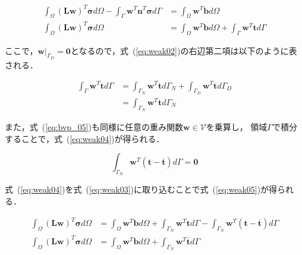 \begin{align}
  \int_\Omega (\boldsymbol{L}\boldsymbol{w})^T \boldsymbol{\sigma} d\Omega - \int_\Gamma \boldsymbol{w}^T\boldsymbol{n}^T\boldsymbol{\sigma} d\Gamma &= \int_\Omega \boldsymbol{w}^T \boldsymbol{b} d\Omega \nonumber \\
  \label{eq:weak02}
  \int_\Omega (\boldsymbol{L}\boldsymbol{w})^T \boldsymbol{\sigma} d\Omega &= \int_\Omega \boldsymbol{w}^T \boldsymbol{b} d\Omega + \int_\Gamma \boldsymbol{w}^T \boldsymbol{t} d\Gamma
\end{align}

\noindent
ここで，$\boldsymbol{w}|_{\Gamma_D}=\boldsymbol{0}$となるので，式~(\ref{eq:weak02})の右辺第二項は以下のように表される．

\begin{align}
  \int_\Gamma \boldsymbol{w}^T \boldsymbol{t} d\Gamma &= \int_{\Gamma_N} \boldsymbol{w}^T \boldsymbol{t} d\Gamma_N + \int_{\Gamma_D} \boldsymbol{w}^T \boldsymbol{t} d\Gamma_D \nonumber \\
  \label{eq:weak03}
  &= \int_{\Gamma_N} \boldsymbol{w}^T \boldsymbol{t} d\Gamma_N
\end{align}

\noindent
また，式~(\ref{eq:bvp_05})も同様に任意の重み関数$\boldsymbol{w}\in\mathcal{V}$を乗算し，
領域$\Gamma$で積分することで，式~(\ref{eq:weak04})が得られる．

\begin{equation}
  \label{eq:weak04}
  \int _{\Gamma_N} \boldsymbol{w}^T (\boldsymbol{t} - \overline{\boldsymbol{t}}) d\Gamma = \boldsymbol{0}
\end{equation}

\newpage

\noindent
式~(\ref{eq:weak04})を式~(\ref{eq:weak03})に取り込むことで式~(\ref{eq:weak05})が得られる．

\begin{align}
  \int_\Omega (\boldsymbol{L}\boldsymbol{w})^T \boldsymbol{\sigma} d\Omega &= \int_\Omega \boldsymbol{w}^T \boldsymbol{b} d\Omega + \int_{\Gamma_N} \boldsymbol{w}^T \boldsymbol{t} d\Gamma - \int_{\Gamma_N} \boldsymbol{w}^T (\boldsymbol{t} - \overline{\boldsymbol{t}}) d\Gamma \nonumber \\
  \label{eq:weak05}
  \int_\Omega (\boldsymbol{L}\boldsymbol{w})^T \boldsymbol{\sigma} d\Omega &= \int_\Omega \boldsymbol{w}^T \boldsymbol{b} d\Omega + \int_{\Gamma_N} \boldsymbol{w}^T \overline{\boldsymbol{t}} d\Gamma
\end{align}

